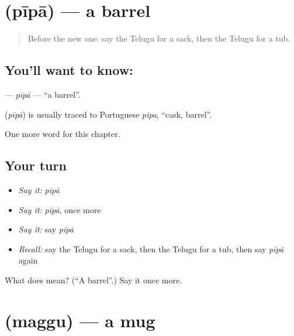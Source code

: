 \section[\texorpdfstring{\te{పీపా} (pīpā)}{పీపా (pīpā)}]{ (pīpā) — a barrel}

\label{lesson:TE-C232-pipa}



\begin{quote}
Before the new one: say the Telugu for a sack, then the Telugu for a tub.
\end{quote}

\subsection*{You'll want to know: }
\textbf{} — \emph{pīpā} — \textquotedblleft{}a barrel\textquotedblright{}.

\begin{cousinweb}
\textbf{} (\emph{pīpā}) is usually traced to Portuguese \emph{pipa}, \textquotedblleft{}cask, barrel\textquotedblright{}.
\end{cousinweb}

\begin{grammarlens}[title={What you've built}]
One more word for this chapter.
\end{grammarlens}

\subsection*{Your turn}
\begin{itemize}
\raggedright
  \item \emph{Say it:} \emph{pīpā}
  \item \emph{Say it:} \emph{pīpā}, once more
  \item \emph{Say it:} say \emph{pīpā}
  \item \emph{Recall:} say the Telugu for a sack, then the Telugu for a tub, then say \emph{pīpā} again
\end{itemize}

\begin{tcolorbox}[breakable,colback=teal!4,colframe=teal!35!black,title={Before you move on}]
What does  mean? (\textquotedblleft{}A barrel\textquotedblright{}.) Say it once more.
\end{tcolorbox}
\section[\texorpdfstring{\te{మగ్గు} (maggu)}{మగ్గు (maggu)}]{ (maggu) — a mug}

